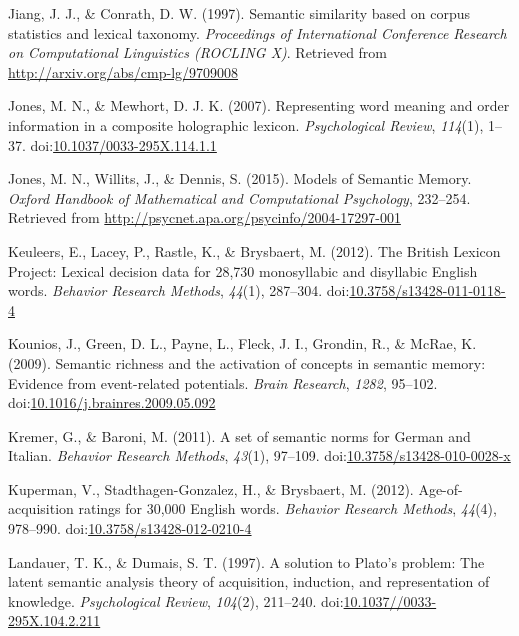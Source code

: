 \documentclass[english,,man]{apa6}
\theoremstyle{definition}
\theoremstyle{definition}
\theoremstyle{definition}
\theoremstyle{remark}
\begin{document}
\hypertarget{ref-Jiang1997}{}
Jiang, J. J., \& Conrath, D. W. (1997). Semantic similarity based on
corpus statistics and lexical taxonomy. \emph{Proceedings of
International Conference Research on Computational Linguistics (ROCLING
X)}. Retrieved from \url{http://arxiv.org/abs/cmp-lg/9709008}

\hypertarget{ref-Jones2007}{}
Jones, M. N., \& Mewhort, D. J. K. (2007). Representing word meaning and
order information in a composite holographic lexicon.
\emph{Psychological Review}, \emph{114}(1), 1--37.
doi:\href{https://doi.org/10.1037/0033-295X.114.1.1}{10.1037/0033-295X.114.1.1}

\hypertarget{ref-Jones2015a}{}
Jones, M. N., Willits, J., \& Dennis, S. (2015). Models of Semantic
Memory. \emph{Oxford Handbook of Mathematical and Computational
Psychology}, 232--254. Retrieved from
\url{http://psycnet.apa.org/psycinfo/2004-17297-001}

\hypertarget{ref-Keuleers2012}{}
Keuleers, E., Lacey, P., Rastle, K., \& Brysbaert, M. (2012). The
British Lexicon Project: Lexical decision data for 28,730 monosyllabic
and disyllabic English words. \emph{Behavior Research Methods},
\emph{44}(1), 287--304.
doi:\href{https://doi.org/10.3758/s13428-011-0118-4}{10.3758/s13428-011-0118-4}

\hypertarget{ref-Kounios2009}{}
Kounios, J., Green, D. L., Payne, L., Fleck, J. I., Grondin, R., \&
McRae, K. (2009). Semantic richness and the activation of concepts in
semantic memory: Evidence from event-related potentials. \emph{Brain
Research}, \emph{1282}, 95--102.
doi:\href{https://doi.org/10.1016/j.brainres.2009.05.092}{10.1016/j.brainres.2009.05.092}

\hypertarget{ref-Kremer2011a}{}
Kremer, G., \& Baroni, M. (2011). A set of semantic norms for German and
Italian. \emph{Behavior Research Methods}, \emph{43}(1), 97--109.
doi:\href{https://doi.org/10.3758/s13428-010-0028-x}{10.3758/s13428-010-0028-x}

\hypertarget{ref-Kuperman2012}{}
Kuperman, V., Stadthagen-Gonzalez, H., \& Brysbaert, M. (2012).
Age-of-acquisition ratings for 30,000 English words. \emph{Behavior
Research Methods}, \emph{44}(4), 978--990.
doi:\href{https://doi.org/10.3758/s13428-012-0210-4}{10.3758/s13428-012-0210-4}

\hypertarget{ref-Landauer1997}{}
Landauer, T. K., \& Dumais, S. T. (1997). A solution to Plato's problem:
The latent semantic analysis theory of acquisition, induction, and
representation of knowledge. \emph{Psychological Review}, \emph{104}(2),
211--240.
doi:\href{https://doi.org/10.1037//0033-295X.104.2.211}{10.1037//0033-295X.104.2.211}
\end{document}
